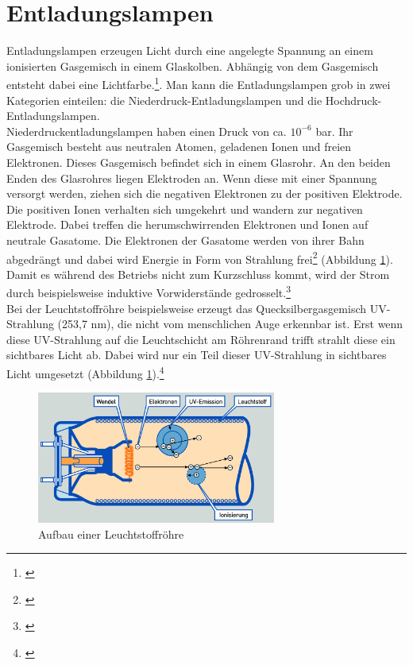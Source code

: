 \section{Entladungslampen} \label{sec_entladungslampe}
Entladungslampen erzeugen Licht durch eine angelegte Spannung an einem ionisierten Gasgemisch in einem Glaskolben. Abhängig von dem Gasgemisch entsteht dabei eine Lichtfarbe.\footnote{\cite[140]{mueller}}. Man kann die Entladungslampen grob in zwei Kategorien einteilen: die Niederdruck-Entladungslampen und die Hochdruck-Entladungslampen.\\

\noindent Niederdruckentladungslampen haben einen Druck von ca. $10^{-6}$ bar. Ihr Gasgemisch besteht aus neutralen Atomen, geladenen Ionen und freien Elektronen. Dieses Gasgemisch befindet sich in einem Glasrohr. An den beiden Enden des Glasrohres liegen Elektroden an. Wenn diese mit einer Spannung versorgt werden, ziehen sich die negativen Elektronen zu der positiven Elektrode. Die positiven Ionen verhalten sich umgekehrt und wandern zur negativen Elektrode. Dabei treffen die herumschwirrenden Elektronen und Ionen auf neutrale Gasatome. Die Elektronen der Gasatome werden von ihrer Bahn abgedrängt und dabei wird Energie in Form von Strahlung frei\footnote{\cite[93]{ris}} (Abbildung \ref{b_leuchtstoff}). Damit es während des Betriebs nicht zum Kurzschluss kommt, wird der Strom durch beispielsweise induktive Vorwiderstände gedrosselt.\footnote{\cite[141]{mueller}}\\
Bei der Leuchtstoffröhre beispielsweise erzeugt das Quecksilbergasgemisch UV-Strahlung (253,7 nm), die nicht vom menschlichen Auge erkennbar ist. Erst wenn diese UV-Strahlung auf die Leuchtschicht am Röhrenrand trifft strahlt diese ein sichtbares Licht ab. Dabei wird nur ein Teil dieser UV-Strahlung in sichtbares Licht umgesetzt (Abbildung \ref{b_leuchtstoff}).\footnote{\cite[96]{ris}}

\begin{figure}[htp]     %
\centering
\includegraphics[width=0.7\textwidth]{bilder/leuchtstoff} 
\caption {Aufbau einer Leuchtstoffröhre\protect\footnotemark}\label{b_leuchtstoff}
\end{figure}

